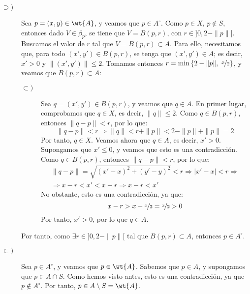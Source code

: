 \documentclass[12pt]{article}
\begin{document}
\begin{ejercicio}[5 puntos]
\begin{enumerate}
          \begin{description}
            \item[$\supset)$] Sea $p=(x,y)\in \wt{A}$, y veamos que $p\in A^\circ$. Como $p\in X$, $p\notin S$,
            entonces dado $V\in \beta_p$, se tiene que $V=B(p,r)$, con $r\in ]0,2-\|p\|[$. Buscamos el valor de $r$ tal que
            $V=B(p,r)\subset A$. Para ello, necesitamos que, para todo $(x',y')\in B(p,r)$, se tenga que $(x',y')\in A$; es decir,
            $x'>0$ y $\|(x',y')\|\leq 2$. Tomamos entonces $r=\min\left\{2-\|p\|,~\nicefrac{x}{2}\right\}$, y veamos que
            $B(p,r)\subset A$:
            \begin{description}
              \item[$\subset)$] Sea $q=(x',y')\in B(p,r)$, y veamos que $q\in A$. En primer lugar, comprobamos que
              $q\in X$, es decir, $\|q\|\leq 2$. Como $q\in B(p,r)$, entonces $\|q-p\|<r$, por lo que:
              \begin{equation*}
                \|q-p\|< r \Longrightarrow \|q\| < r+\|p\| < 2-\|p\|+\|p\| = 2
              \end{equation*}
              Por tanto, $q\in X$. Veamos ahora que $q\in A$, es decir, $x'>0$. Supongamos que $x'\leq 0$, y veamos que
              esto es una contradicción. Como $q\in B(p,r)$, entonces $\|q-p\|<r$, por lo que:
              \begin{multline*}
                \|q-p\|= \sqrt{(x'-x)^2+(y'-y)^2} < r \Longrightarrow |x'-x| < r
                \Longrightarrow \\ \Longrightarrow
                x-r < x' < x+r \Longrightarrow x-r < x'
              \end{multline*}
              No obstante, esto es una contradicción, ya que: $$x-r > x-\nicefrac{x}{2} = \nicefrac{x}{2} > 0$$
              Por tanto, $x'>0$, por lo que $q\in A$.
            \end{description}

            Por tanto, como $\exists r\in ]0,2-\|p\|[$ tal que $B(p,r)\subset A$, entonces $p\in A^\circ$.

            \item[$\subset)$] Sea $p\in A^\circ$, y veamos que $p\in \wt{A}$. Sabemos que $p\in A$, y supongamos que
            $p\in A\cap S$. Como hemos visto antes, esto es una contradicción, ya que $p\notin A^\circ$. Por tanto,
            $p\in A\setminus S=\wt{A}$.
          \end{description}


\end{enumerate}
\end{ejercicio}
\end{document}
